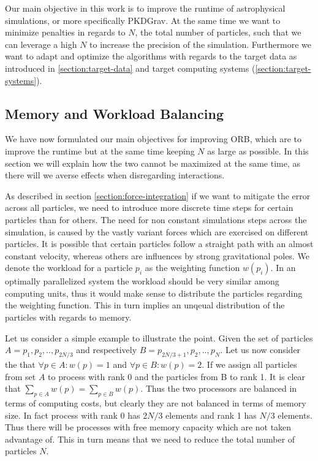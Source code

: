 \documentclass[]{article}
\begin{document}
Our main objective in this work is to improve the runtime of astrophysical simulations, or more specifically PKDGrav. At the same time we want to minimize penalties in regards to $N$, the total number of particles, such that we can leverage a high $N$ to increase the precision of the simulation. Furthermore we want to adapt and optimize the algorithms with regards to the target data as introduced in \ref{section:target-data} and target computing systems (\ref{section:target-systems}).

\subsection{Memory and Workload Balancing}\label{sec:balancing}
We have now formulated our main objectives for improving ORB, which are to improve the runtime but at the same time keeping $N$ as large as possible. In this section we will explain how the two cannot be maximized at the same time, as there will we averse effects when disregarding interactions. 

As described in section \ref{section:force-integration} if we want to mitigate the error across all particles, we need to introduce more discrete time steps for certain particles than for others. The need for non constant simulations steps across the simulation, is caused by the vastly variant forces which are exercised on different particles. It is possible that certain particles follow a straight path with an almost constant velocity, whereas others are influences by strong gravitational poles. We denote the workload for a particle $p_i$ as the weighting function $w(p_i)$. In an optimally parallelized system the workload should be very similar among computing units, thus it would make sense to distribute the particles regarding the weighting function. This in turn implies an unqeual distribution of the particles with regards to memory.  

Let us consider a simple example to illustrate the point. Given the set of particles $A = {p_1, p_2, .., p_{2N/3}}$ and respectively $B = {p_{2N/3 + 1}, p_2, .., p_{N}}$. Let us now consider the that $\forall p \in A : w(p) = 1$ and $\forall p \in B : w(p) = 2$. If we assign all particles from set $A$ to process with rank 0 and the particles from B to rank 1. It is clear that $\sum_{p\in A}^{} w(p) = \sum_{p\in B}^{} w(p)$. Thus the two processors are balanced in terms of computing costs, but clearly they are not balanced in terms of memory size. In fact process with rank 0 has $2N/3$ elements and rank 1 has $N/3$ elements. Thus there will be processes with free memory capacity which are not taken advantage of. This in turn means that we need to reduce the total number of particles $N$. 
\end{document}
